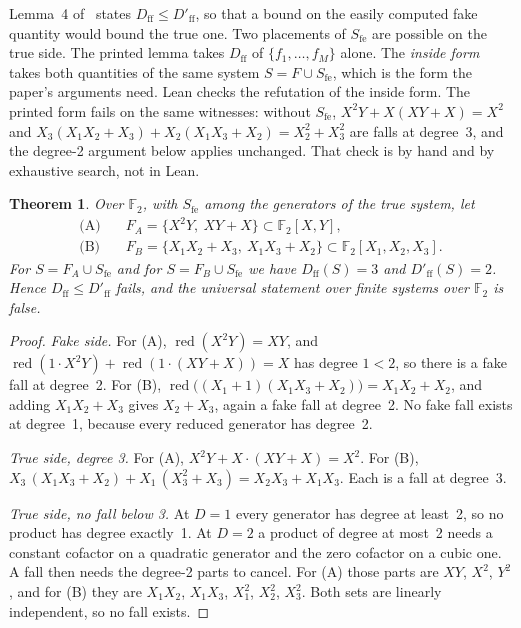 \documentclass[11pt,a4paper]{article}
\theoremstyle{plain}
\newtheorem{theorem}{Theorem}
\theoremstyle{definition}
\theoremstyle{remark}
\newcommand{\FF}{\mathbb{F}}
\newcommand{\Sfe}{S_{\mathrm{fe}}}
\newcommand{\Dff}{D_{\mathrm{ff}}}
\newcommand{\Dfake}{D'_{\mathrm{ff}}}
\newcommand{\red}{\operatorname{red}}
\begin{document}
Lemma~4 of~\cite{nagao15} states $\Dff\le\Dfake$, so that a bound on the easily
computed fake quantity would bound the true one. Two placements of $\Sfe$ are
possible on the true side. The printed lemma takes $\Dff$ of
$\{f_1,\dots,f_M\}$ alone. The \emph{inside form} takes both quantities of
the same system $S=F\cup\Sfe$, which is the form the paper's arguments
need. Lean checks the refutation of the inside form. The printed form fails
on the same witnesses: without $\Sfe$, $X^2Y+X(XY+X)=X^2$ and
$X_3(X_1X_2+X_3)+X_2(X_1X_3+X_2)=X_2^2+X_3^2$ are falls at degree~3, and the
degree-2 argument below applies unchanged. That check is by hand and by
exhaustive search, not in Lean.

\begin{theorem}\label{thm:nagao}
Over $\FF_2$, with $\Sfe$ among the generators of the true system, let
\begin{align*}
\text{(A)}\quad & F_A=\{X^2Y,\ XY+X\}\subset\FF_2[X,Y],\\
\text{(B)}\quad & F_B=\{X_1X_2+X_3,\ X_1X_3+X_2\}\subset\FF_2[X_1,X_2,X_3].
\end{align*}
For $S=F_A\cup\Sfe$ and for $S=F_B\cup\Sfe$ we have $\Dff(S)=3$ and
$\Dfake(S)=2$. Hence $\Dff\le\Dfake$ fails, and the universal statement over
finite systems over $\FF_2$ is false.
\end{theorem}

\begin{proof}
\emph{Fake side.} For (A), $\red(X^2Y)=XY$, and
$\red(1\cdot X^2Y)+\red(1\cdot(XY+X))=X$ has degree $1<2$, so there is a fake
fall at degree~2. For (B),
$\red\bigl((X_1+1)(X_1X_3+X_2)\bigr)=X_1X_2+X_2$, and adding $X_1X_2+X_3$ gives
$X_2+X_3$, again a fake fall at degree~2. No fake fall exists at degree~1,
because every reduced generator has degree~2.

\emph{True side, degree 3.} For (A), $X^2Y+X\cdot(XY+X)=X^2$. For (B),
$X_3\,(X_1X_3+X_2)+X_1\,(X_3^2+X_3)=X_2X_3+X_1X_3$. Each is a fall at degree~3.

\emph{True side, no fall below 3.} At $D=1$ every generator has degree at
least~2, so no product has degree exactly~1. At $D=2$ a product of degree at
most~2 needs a constant cofactor on a quadratic generator and the zero
cofactor on a cubic one. A fall then needs the degree-2 parts to cancel.
For (A) those parts are $XY$, $X^2$, $Y^2$, and for (B) they are $X_1X_2$,
$X_1X_3$, $X_1^2$, $X_2^2$, $X_3^2$. Both sets are linearly independent, so
no fall exists.
\end{proof}
\end{document}
